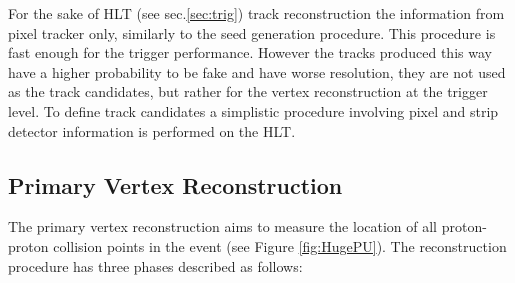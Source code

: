 For the sake of HLT (see sec.\ref{sec:trig}) track reconstruction the information from pixel tracker only, similarly to the seed generation procedure\cite{Chatrchyan:2014fea}.
This procedure is fast enough for the trigger performance. However the tracks produced this way have a higher probability to be fake and have worse resolution, they
are not used as the track candidates, but rather for the vertex reconstruction at the trigger level. To define track candidates a simplistic procedure
involving pixel and strip detector information is performed on the HLT\cite{Chatrchyan:2014fea}.

\subsection{Primary Vertex Reconstruction}\label{ssec:vtxReco}

The primary vertex reconstruction aims to measure the location of all proton-proton collision points in the event (see Figure \ref{fig:HugePU}). The reconstruction procedure has three
phases described as follows\cite{Chatrchyan:2014fea}:

